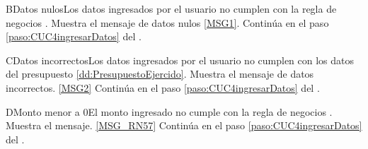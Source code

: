	\begin{UCtrayectoriaA}{B}{Datos nulos}{Los datos ingresados por el usuario  no cumplen con la regla de negocios .}
			\UCpaso Muestra el mensaje de datos nulos \ref{MSG1}.
			\UCpaso Continúa en el paso \ref{paso:CUC4ingresarDatos} del .
	\end{UCtrayectoriaA}
	\begin{UCtrayectoriaA}{C}{Datos incorrectos}{Los datos ingresados por el usuario  no cumplen con los datos del presupuesto \ref{dd:PresupuestoEjercido}.}
			\UCpaso Muestra el mensaje de datos incorrectos. \ref{MSG2}
			\UCpaso Continúa en el paso \ref{paso:CUC4ingresarDatos} del .
	\end{UCtrayectoriaA}

	\begin{UCtrayectoriaA}{D}{Monto menor a 0}{El monto ingresado no cumple con la regla de negocios .}
		\UCpaso Muestra el mensaje. \ref{MSG_RN57}
		\UCpaso Continúa en el paso \ref{paso:CUC4ingresarDatos} del .
	\end{UCtrayectoriaA}

